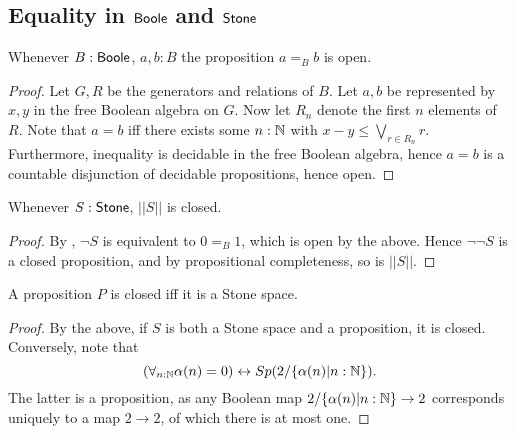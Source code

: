 \subsection{Equality in $\mathsf{Boole}$ and $\mathsf{Stone}$}
\begin{lemma}\label{BooleEqualityOpen}
  Whenever $B:\mathsf{Boole}$, $a,b:B$ the proposition $a=_Bb$ is open. 
\end{lemma}
\begin{proof}
  Let $G,R$ be the generators and relations of $B$. 
  Let $a,b$ be represented by $x,y$ in the free Boolean algebra on $G$. 
  Now let $R_n$ denote the first $n$ elements of $R$. 
  Note that $a=b$ iff there exists some $n:\mathbb{N}$ with $x-y \leq \bigvee_{r\in R_n} r$. 
  Furthermore, inequality is decidable in the free Boolean algebra, hence
  $a=b$ is a countable disjunction of decidable propositions, hence open. 
\end{proof}


\begin{corollary}\label{TruncationStoneClosed}
  Whenever $S:\mathsf{Stone}$, $||S||$ is closed. 
\end{corollary}
\begin{proof}
  By , $\neg S$ is equivalent to $0=_B 1$, which is open by the above. 
  Hence $\neg \neg S$ is a closed proposition, and by propositional completeness, so is $||S||$. 
\end{proof}

\begin{corollary}\label{PropositionsClosedIffStone}
  A proposition $P$ is closed iff it is a Stone space. 
\end{corollary}
\begin{proof}
  By the above, if $S$ is both a Stone space and a proposition, it is closed. 
  Conversely, note that 
  $$
  (\forall_{n:\mathbb{N}} \alpha(n) = 0 )\leftrightarrow Sp(2/\{\alpha(n)| n:\mathbb{N}\}).
  $$
  The latter is a proposition, as
  any Boolean map $2/\{\alpha(n)|n:\mathbb{N}\} \to 2$
  corresponds uniquely to a map $2\to 2$, of which there is at most one. 
\end{proof}

